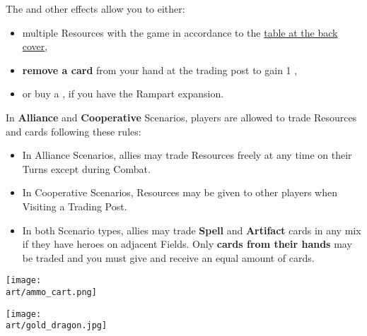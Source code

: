 \begin{multicols}{2}

The  and other effects allow you to either:
\begin{itemize}
  \item {} multiple Resources with the game in accordance to the \hyperlink{Trade Table}{table at the back cover},
  \item \textbf{remove a card} from your hand at the trading post to gain 1 ,
    \par
  \item or buy a , if you have the Rampart expansion.
\end{itemize}
In \textbf{Alliance} and \textbf{Cooperative} Scenarios, players are allowed to trade Resources and cards following these rules:
\begin{itemize}
  \item In Alliance Scenarios, allies may trade Resources freely at any time on their Turns except during Combat.
  \item In Cooperative Scenarios, Resources may be given to other players when Visiting a Trading Post.
  \item In both Scenario types, allies may trade \textbf{Spell} and \textbf{Artifact} cards in any mix if they have heroes on adjacent Fields.
    Only \textbf{cards from their hands} may be traded and you must give and receive an equal amount of cards.
\end{itemize}

\medskip

\begin{center}
  \texttt{[image: \\art/ammo\_cart.png]}
\end{center}

\end{multicols}

\begin{scaledfigure}[blanker]
  \centering
  \texttt{[image: \\art/gold\_dragon.jpg]}
\end{scaledfigure}
